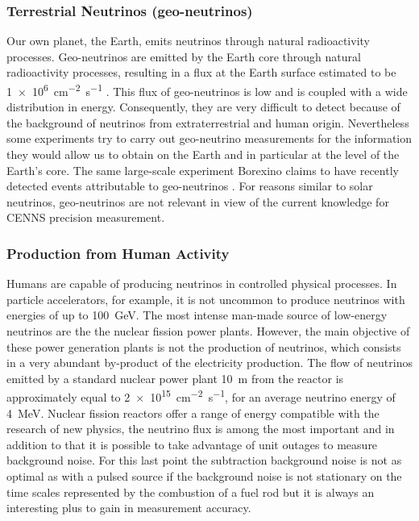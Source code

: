 \subsubsection{Terrestrial Neutrinos (geo-neutrinos)}

Our own planet, the Earth, emits neutrinos through natural radioactivity processes.
Geo-neutrinos are emitted by the Earth core through natural radioactivity processes, resulting in a flux at the Earth surface estimated to be \SI{1e6}{\cm^{-2} \s^{-1}} \cite{Bellini:2013}. This flux of geo-neutrinos is low and is coupled with a wide distribution in energy. Consequently, they are very difficult to detect because of the background of neutrinos from extraterrestrial and human origin. Nevertheless some experiments try to carry out geo-neutrino measurements for the information they would allow us to obtain on the Earth and in particular at the level of the Earth's core. The same large-scale experiment Borexino claims to have recently detected events attributable to geo-neutrinos \cite{Agostini:2020geo}.
For reasons similar to solar neutrinos, geo-neutrinos are not relevant in view of the current knowledge for CENNS precision measurement.

\subsubsection{Production from Human Activity}

Humans are capable of producing neutrinos in controlled physical processes. In particle accelerators, for example, it is not uncommon to produce neutrinos with energies of up to \SI{100}{\giga\eV}. The most intense man-made source of low-energy neutrinos are the the nuclear fission power plants. However, the main objective of these power generation plants is not the production of neutrinos, which consists in a very abundant by-product of the electricity production. The flow of neutrinos emitted by a standard nuclear power plant \SI{10}{\m} from the reactor is approximately equal to \SI{2e15}{\cm^{-2} \s^{-1}}, for an average neutrino energy of \SI{4}{\mega\eV}. Nuclear fission reactors offer a range of energy compatible with the research of new physics, the neutrino flux is among the most important and in addition to that it is possible to take advantage of unit outages to measure background noise. For this last point the subtraction background noise is not as optimal as with a pulsed source if the background noise is not stationary on the time scales represented by the combustion of a fuel rod but it is always an interesting plus to gain in measurement accuracy.


